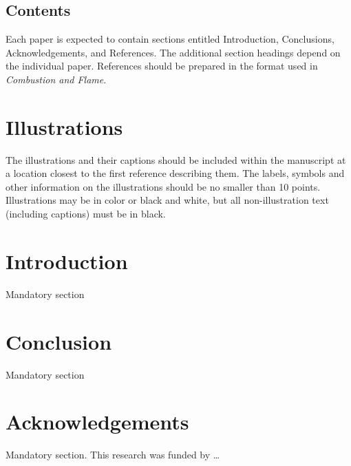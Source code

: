 \documentclass[twocolumn,10pt,a4paper]{ecm}
\begin{document}
\subsection*{Contents}
Each paper is expected to contain sections entitled Introduction, Conclusions, Acknowledgements, and References.
The additional section headings depend on the individual paper.
References should be prepared in the format used in {\it Combustion and Flame}.

\section*{Illustrations}
The illustrations and their captions should be included within the manuscript at a location closest to the first reference describing them.
The labels, symbols and other information on the illustrations should be no smaller than 10 points.
Illustrations may be in color or black and white, but all non-illustration text (including captions) must be in black.

\section*{Introduction}
Mandatory section

\section*{Conclusion}
Mandatory section

\section*{Acknowledgements}
Mandatory section.
This research was funded by \ldots

\printbibliography

\balance %
\end{document}
